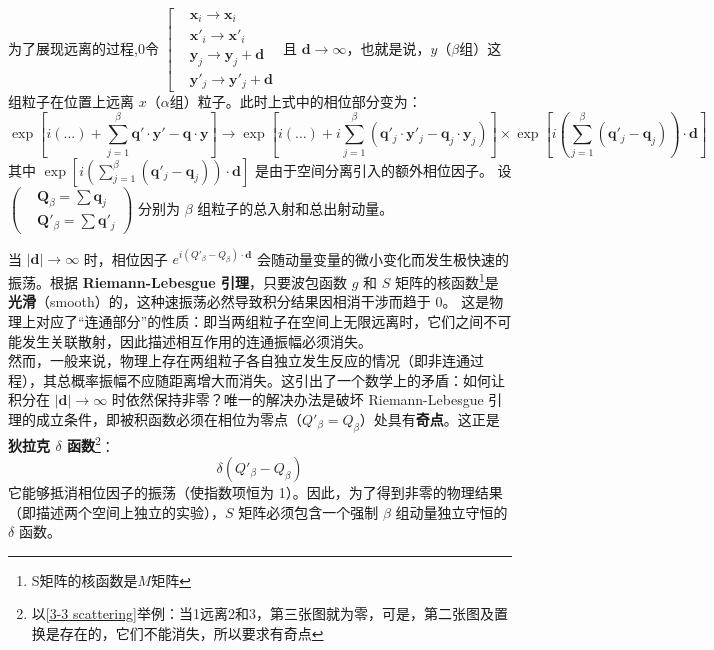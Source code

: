 为了展现远离的过程,0️令
$\left[\begin{aligned}
    &\boldsymbol{x}_i \to \boldsymbol{x}_i \\
    & \boldsymbol{x}'_i \to \boldsymbol{x}'_i  \\
    &\boldsymbol{y}_j \to \boldsymbol{y}_j+ \boldsymbol{d}\\
    & \boldsymbol{y}'_j \to \boldsymbol{y}'_j+ \boldsymbol{d}
\end{aligned}\right.$ 
且 $\boldsymbol{d}\to\infty$，也就是说，$y$（$\beta$组）这组粒子在位置上远离 $x$（$\alpha$组）粒子。此时上式中的相位部分变为：
\begin{equation}
    \exp\left[i\left(\dots\right)+\sum_{j=1}^\beta \boldsymbol{q}' \cdot \boldsymbol{y}' - \boldsymbol{q} \cdot \boldsymbol{y} \right]
\to\exp\left[i\left(\dots\right)+ i\sum_{j=1}^\beta (\boldsymbol{q}'_j \cdot \boldsymbol{y}'_j - \boldsymbol{q}_j \cdot \boldsymbol{y}_j) \right]
    \times \exp\left[ i \left( \sum_{j=1}^\beta (\boldsymbol{q}'_j - \boldsymbol{q}_j) \right) \cdot \boldsymbol{d} \right]
\end{equation}
其中 $\exp\left[ i \left( \sum_{j=1}^\beta (\boldsymbol{q}'_j - \boldsymbol{q}_j) \right) \cdot \boldsymbol{d} \right]$ 是由于空间分离引入的额外相位因子。
设$\left(\begin{aligned}
    &\boldsymbol{Q}_{\beta} = \sum \boldsymbol{q}_j \\ &\boldsymbol{Q}'_{\beta} = \sum \boldsymbol{q}'_j
\end{aligned}\right)$  分别为 $\beta$ 组粒子的总入射和总出射动量。\\
\vspace{0.2cm}

当 $|\mathbf{d}| \to \infty$ 时，相位因子 $e^{i(Q'_\beta - Q_\beta)\cdot \mathbf{d}}$ 会随动量变量的微小变化而发生极快速的振荡。\color{blue}根据 \textbf{Riemann-Lebesgue 引理}，只要波包函数 $g$ 和 $S$ 矩阵的核函数\footnote{S矩阵的核函数是$M$矩阵}是\textbf{光滑}（smooth）的，这种速振荡必然导致积分结果因相消干涉而趋于 $0$。
\normalcolor 这是物理上对应了“连通部分”的性质：即当两组粒子在空间上无限远离时，它们之间不可能发生关联散射，因此描述相互作用的连通振幅必须消失。
\\
然而，一般来说，物理上存在两组粒子各自独立发生反应的情况（即非连通过程），其总概率振幅不应随距离增大而消失。这引出了一个数学上的矛盾：如何让积分在 $|\mathbf{d}| \to \infty$ 时依然保持非零？唯一的解决办法是破坏 Riemann-Lebesgue 引理的成立条件，即被积函数必须在相位为零点（$Q'_\beta = Q_\beta$）处具有\textbf{奇点}。这正是\textbf{狄拉克 $\delta$ 函数}\footnote{以\autoref{3-3 scattering}举例：当1远离2和3，第三张图就为零，可是，第二张图及置换是存在的，它们不能消失，所以要求有奇点}：
\begin{equation}
    \delta(Q'_\beta - Q_\beta)
\end{equation}
它能够抵消相位因子的振荡（使指数项恒为 1）。因此，为了得到非零的物理结果（即描述两个空间上独立的实验），$S$ 矩阵必须包含一个强制 $\beta$ 组动量独立守恒的 $\delta$ 函数。


